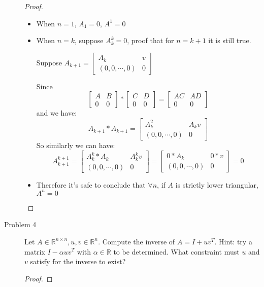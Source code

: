 \documentclass{article}
\begin{document}
\begin{description}
\begin{proof}
		      \begin{itemize}
			      \item When $n = 1$, $A_1 = 0$, $A^1 = 0$
			      \item When $n = k$, suppose $A_k^k = 0$, proof that for $n = k+1$ it is still true.

			            Suppose $A_{k+1} = \begin{bmatrix}
					            A_k               & \textit{v} \\
					            (0, 0, \cdots, 0) & 0
				            \end{bmatrix}	$

			            Since
			            $$\begin{bmatrix}
					            A & B \\
					            0 & 0
				            \end{bmatrix} * \begin{bmatrix}
					            C & D \\
					            0 & 0
				            \end{bmatrix} = \begin{bmatrix}
					            AC & AD \\
					            0  & 0
				            \end{bmatrix}
			            $$
			            and we have:
			            $$A_{k+1} * A_{k+1} = \begin{bmatrix}
					            A_k^2             & A_k\textit{v} \\
					            (0, 0, \cdots, 0) & 0
				            \end{bmatrix}	$$
			            So similarly we can have:
			            $$A_{k+1}^{k+1} = \begin{bmatrix}
					            A_k^k * A_k       & A_k^k\textit{v} \\
					            (0, 0, \cdots, 0) & 0
				            \end{bmatrix} = \begin{bmatrix}
					            0 * A_k           & 0 * \textit{v} \\
					            (0, 0, \cdots, 0) & 0
				            \end{bmatrix} = 0	$$
			      \item Therefore it's safe to conclude that $\forall n$, if $A$ is strictly lower triangular, $A^n = 0$
		      \end{itemize}
	      \end{proof}
	\item[Problem 4] Let $A \in \mathbb{R}^{n\times n}, \textit{u}, \textit{v} \in \mathbb{R}^n$. Compute the inverse of $A = I + \textit{u}\textit{v}^T$.
	      Hint:
	      try a matrix $I - \alpha \textit{u} \textit{v}^T$ with $\alpha \in \mathbb{R}$ to be determined.
	      What constraint must $\textit{u}$ and $\textit{v}$ satisfy for the inverse to exist?
	      \begin{proof}


\end{proof}
\end{description}
\end{document}
